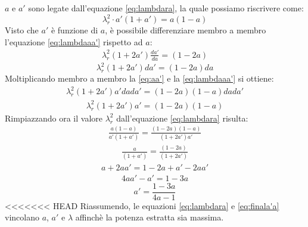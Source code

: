 $a$ e $a'$ sono legate dall'equazione \ref{eq:lambdara}, la quale possiamo riscrivere come:
\begin{equation}\label{eq:lambdaraa'}
\lambda_r^2 \cdot a' \left( 1+ a' \right) = a \left( 1 - a \right)
\end{equation}
Visto che $a'$ è funzione di $a$, è possibile differenziare membro a membro l'equazione \ref{eq:lambdaaa'} rispetto ad $a$:
\begin{align*}
\lambda_r^2 \left( 1+ 2a' \right) \frac{da'}{da} = \left( 1 - 2a \right)
\end{align*}
\begin{equation}\label{eq:lambdaaa'}
\lambda_r^2 \left( 1+ 2a' \right) da' = \left( 1 - 2a \right)da
\end{equation}
Moltiplicando membro a membro la \ref{eq:aa'} e la \ref{eq:lambdaaa'} si ottiene:
\begin{align*}
\lambda_r^2 \left( 1 + 2a' \right) a' da da' = \left( 1 - 2a \right) \left( 1-a \right) da da'
\end{align*}
\begin{align*}
\lambda_r^2 \left( 1 + 2a' \right) a' = \left( 1- 2a \right) \left(1 -a \right)
\end{align*}
Rimpiazzando ora il valore $\lambda_r^2$ dall'equazione \ref{eq:lambdara} risulta:
\begin{align*}
\frac{a \left(1 - a \right)}{a' \left(1 + a' \right)} = \frac{\left( 1 - 2a \right) \left( 1 -a \right)}{\left(1 + 2a' \right) a'}
\end{align*}
\begin{align*}
\frac{a}{\left( 1 + a' \right)} = \frac{\left( 1 - 2a \right)}{\left( 1 + 2a' \right)}
\end{align*}
\begin{align*}
a + 2 a a' = 1 - 2a + a' - 2aa'
\end{align*}
\begin{align*}
4aa' -a' = 1 - 3a
\end{align*}
\begin{equation}\label{eq:finala'a}
a' = \frac{1 - 3a}{4a -1}
\end{equation}
<<<<<<< HEAD
Riassumendo, le equazioni \ref{eq:lambdara} e \ref{eq:finala'a} vincolano $a$, $a'$ e $\lambda$ affinchè la potenza estratta sia massima.

